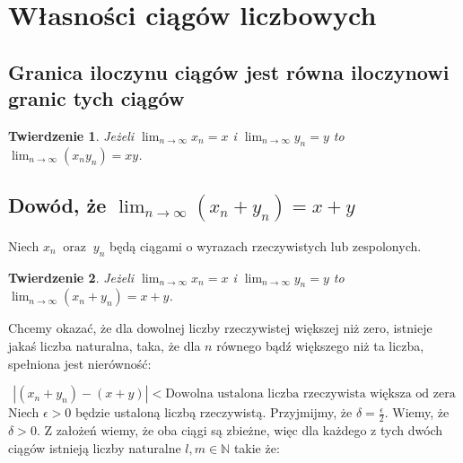 \documentclass[a4paper,oneside,openright,11pt]{article}
\newtheorem{theorem}{Twierdzenie}
\numberwithin{equation}{section}
\begin{document}
%   
%      
%       

\section{Własności ciągów liczbowych}
\subsection{Granica iloczynu ciągów jest równa  iloczynowi granic tych ciągów}



\begin{theorem}
    
    Jeżeli $\lim_{n\to\infty} x_n = x$ i $\lim_{n\to\infty} y_n = y$ 
     to $\lim_{n\to\infty} (x_{n}y_{n}) = xy$.

\end{theorem}

\subsection{Dowód, że $\lim_{n\to\infty} (x_{n} + y_{n}) = x + y$}

Niech $x_{n} \;\; \textrm{oraz} \;\; y_{n}$ będą ciągami o wyrazach rzeczywistych  lub zespolonych.

\begin{theorem}
    
    Jeżeli $\lim_{n\to\infty} x_n = x$ i $\lim_{n\to\infty} y_n = y$ 
     to $\lim_{n\to\infty} (x_{n} + y_{n}) = x + y$.

\end{theorem}


\noindent
Chcemy okazać, że dla dowolnej liczby rzeczywistej większej niż zero, istnieje jakaś liczba naturalna, taka, że dla $n$ równego bądź większego niż ta liczba, spełniona jest nierówność:

\begin{equation*}
    |(x_{n} + y_{n}) - (x + y)| < \textrm{Dowolna ustalona liczba rzeczywista większa od zera}
\end{equation*}
\noindent
Niech $\epsilon > 0$ będzie ustaloną liczbą rzeczywistą. Przyjmijmy, że $\delta = \frac{\epsilon}{2}$. Wiemy, że $\delta > 0$. Z założeń wiemy, że oba ciągi są zbieżne, więc dla każdego z tych dwóch ciągów
istnieją liczby naturalne $l, m \in \mathbb{N}$ takie że:
\end{document}
